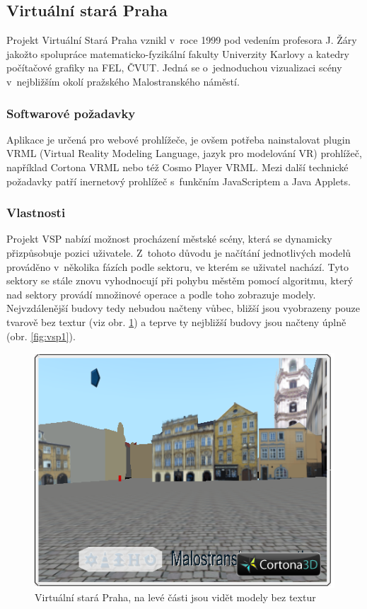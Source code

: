 \documentclass[thesis=B,czech]{FITthesis}[2012/06/26]
\begin{document}
    \subsection{Virtuální stará Praha}
    
    Projekt Virtuální Stará Praha vznikl v~roce 1999 pod vedením profesora J. Žáry jakožto spolupráce matematicko-fyzikální fakulty Univerzity Karlovy a katedry počítačové grafiky na FEL, ČVUT. Jedná se o~jednoduchou vizualizaci scény v~nejbližším okolí pražského Malostranského náměstí. \cite{VSP}
    
        \subsubsection{Softwarové požadavky}
        
        Aplikace je určená pro webové prohlížeče, je ovšem potřeba nainstalovat plugin VRML (Virtual Reality Modeling Language, jazyk pro modelování VR) prohlížeč, například Cortona VRML nebo též Cosmo Player VRML. Mezi další technické požadavky patří inernetový prohlížeč s~funkčním JavaScriptem a Java Applets. \cite{VSP}
        
        \subsubsection{Vlastnosti}
        
        Projekt VSP nabízí možnost procházení městské scény, která se dynamicky přizpůsobuje pozici uživatele. Z~tohoto důvodu je načítání jednotlivých modelů prováděno v~několika fázích podle sektoru, ve kterém se uživatel nachází. Tyto sektory se stále znovu vyhodnocují při pohybu městěm pomocí algoritmu, který nad sektory provádí množinové operace a podle toho zobrazuje modely. Nejvzdálenější budovy tedy nebudou načteny vůbec, bližší jsou vyobrazeny pouze tvarově bez textur (viz obr. \ref{fig:vsp2})  a teprve ty nejbližší budovy jsou načteny úplně (obr. \ref{fig:vsp1}).  \cite{VSP}
        
                
        
	
	\begin{figure}
  		\includegraphics{vsp2.png}
  		\caption{Virtuální stará Praha, na levé části jsou vidět modely bez textur}
  		\label{fig:vsp2}
	\end{figure}
	
\end{document}
